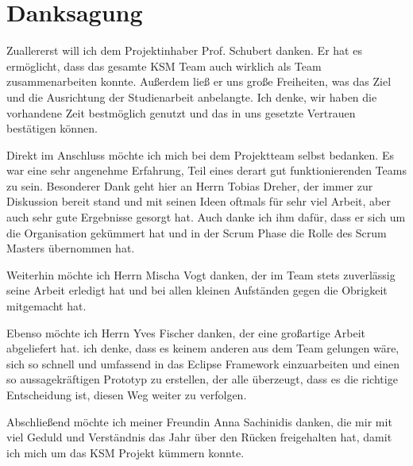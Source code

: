 \section*{Danksagung}

Zuallererst will ich dem Projektinhaber Prof. Schubert danken. Er hat es ermöglicht, dass das gesamte KSM Team auch wirklich als Team zusammenarbeiten konnte. Außerdem ließ er uns große Freiheiten, was das Ziel und die Ausrichtung der Studienarbeit anbelangte. Ich denke, wir haben die vorhandene Zeit bestmöglich genutzt und das in uns gesetzte Vertrauen bestätigen können. 

Direkt im Anschluss möchte ich mich bei dem Projektteam selbst bedanken. Es war eine sehr angenehme Erfahrung, Teil eines derart gut funktionierenden Teams zu sein. Besonderer Dank geht hier an Herrn Tobias Dreher, der immer zur Diskussion bereit stand und mit seinen Ideen oftmals für sehr viel Arbeit, aber auch sehr gute Ergebnisse gesorgt hat. Auch danke ich ihm dafür, dass er sich um die Organisation gekümmert hat und in der Scrum Phase die Rolle des Scrum Masters übernommen hat.

Weiterhin möchte ich Herrn Mischa Vogt danken, der im Team stets zuverlässig seine Arbeit erledigt hat und bei allen kleinen Aufständen gegen die Obrigkeit mitgemacht hat.

Ebenso möchte ich Herrn Yves Fischer danken, der eine großartige Arbeit abgeliefert hat. ich denke, dass es keinem anderen aus dem Team gelungen wäre, sich so schnell und umfassend in das Eclipse Framework einzuarbeiten und einen so aussagekräftigen Prototyp zu erstellen, der alle überzeugt, dass es die richtige Entscheidung ist, diesen Weg weiter zu verfolgen.

Abschließend möchte ich meiner Freundin Anna Sachinidis danken, die mir mit viel Geduld und Verständnis das Jahr über den Rücken freigehalten hat, damit ich mich um das KSM Projekt kümmern konnte.
